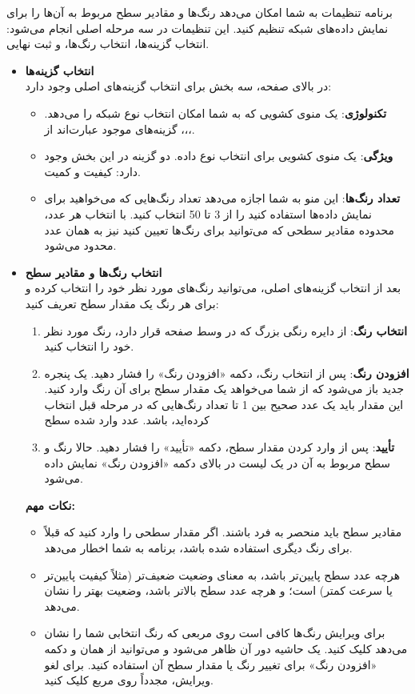 \documentclass{report}
\begin{document}
برنامه تنظیمات به شما امکان می‌دهد رنگ‌ها و مقادیر سطح مربوط به آن‌ها را برای نمایش داده‌های شبکه تنظیم کنید. 
این تنظیمات در سه مرحله اصلی انجام می‌شود: انتخاب گزینه‌ها، انتخاب رنگ‌ها، و ثبت نهایی. 

\begin{itemize}
	\item \textbf{انتخاب گزینه‌ها} \\
	در بالای صفحه، سه بخش برای انتخاب گزینه‌های اصلی وجود دارد:
	
	\begin{itemize}
		\item \textbf{تکنولوژی}: یک منوی کشویی که به شما امکان انتخاب نوع شبکه را می‌دهد. گزینه‌های موجود عبارت‌اند از ،،،.
		\item \textbf{ویژگی}: یک منوی کشویی برای انتخاب نوع داده. دو گزینه در این بخش وجود دارد: کیفیت و کمیت.
		\item \textbf{تعداد رنگ‌ها}: این منو به شما اجازه می‌دهد تعداد رنگ‌هایی که می‌خواهید برای نمایش داده‌ها استفاده کنید را از 3 تا 50 انتخاب کنید. با انتخاب هر عدد، محدوده مقادیر سطحی که می‌توانید برای رنگ‌ها تعیین کنید نیز به همان عدد محدود می‌شود.
	\end{itemize}
	
	\item \textbf{انتخاب رنگ‌ها و مقادیر سطح} \\
	بعد از انتخاب گزینه‌های اصلی، می‌توانید رنگ‌های مورد نظر خود را انتخاب کرده و برای هر رنگ یک مقدار سطح تعریف کنید:
	
	\begin{enumerate}
		\item \textbf{انتخاب رنگ}: از دایره رنگی بزرگ  که در وسط صفحه قرار دارد، رنگ مورد نظر خود را انتخاب کنید.
		\item \textbf{افزودن رنگ}: پس از انتخاب رنگ، دکمه «افزودن رنگ» را فشار دهید. یک پنجره جدید باز می‌شود که از شما می‌خواهد یک مقدار سطح برای آن رنگ وارد کنید. این مقدار باید یک عدد صحیح بین 1 تا تعداد رنگ‌هایی که در مرحله قبل انتخاب کرده‌اید، باشد. عدد وارد شده سطح
		\item \textbf{تأیید}: پس از وارد کردن مقدار سطح، دکمه «تأیید» را فشار دهید. حالا رنگ و سطح مربوط به آن در یک لیست در بالای دکمه «افزودن رنگ» نمایش داده می‌شود.
	\end{enumerate}
	
	\textbf{نکات مهم:}
	\begin{itemize}
		\item مقادیر سطح باید منحصر به فرد باشند. اگر مقدار سطحی را وارد کنید که قبلاً برای رنگ دیگری استفاده شده باشد، برنامه به شما اخطار می‌دهد.
		\item هرچه عدد سطح پایین‌تر باشد، به معنای وضعیت ضعیف‌تر (مثلاً کیفیت پایین‌تر یا سرعت کمتر) است؛ و هرچه عدد سطح بالاتر باشد، وضعیت بهتر را نشان می‌دهد.
		\item برای ویرایش رنگ‌ها کافی است روی مربعی که رنگ انتخابی شما را نشان می‌دهد کلیک کنید. یک حاشیه دور آن ظاهر می‌شود و می‌توانید از همان  و دکمه «افزودن رنگ» برای تغییر رنگ یا مقدار سطح آن استفاده کنید. برای لغو ویرایش، مجدداً روی مربع کلیک کنید.
	\end{itemize}
	

\end{itemize}
\end{document}
